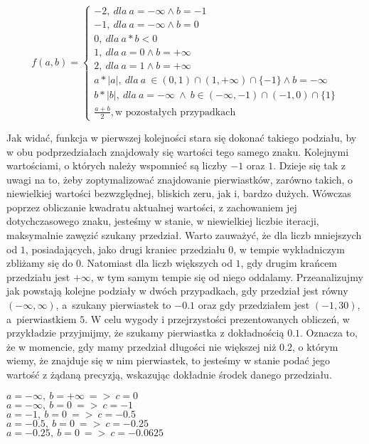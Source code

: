 \[
f(a,b)=\left\{
\begin{array}{ll}
-2,\ dla\ a=-\infty \wedge b=-1\\
-1,\ dla\ a=-\infty \wedge b=0\\
0,\ dla\ a*b<0\\
1,\ dla\ a=0 \wedge b=+\infty\\
2,\ dla\ a=1 \wedge b=+\infty\\
a*|a|,\ dla\ a~\in (0,1) \cap (1,+\infty) \cap \{-1\} \wedge b=-\infty\ \\
b*|b|,\ dla\ a=-\infty\ \wedge \ b \in (-\infty,-1) \cap (-1,0) \cap \{1\}\\
\frac{a+b}{2},\text{w pozostałych przypadkach}
\end{array}
\right.
\]

Jak widać, funkcja w pierwszej kolejności stara się dokonać takiego podziału, by w obu podprzedziałach znajdowały się wartości tego samego znaku. Kolejnymi wartościami, o których należy wspomnieć są liczby $-1$ oraz $1$. Dzieje się tak z uwagi na to, żeby zoptymalizować znajdowanie pierwiastków, zarówno takich, o niewielkiej wartości bezwzględnej, bliskich zeru, jak i, bardzo dużych. Wówczas poprzez obliczanie kwadratu aktualnej wartości, z zachowaniem jej dotychczasowego znaku, jesteśmy w stanie, w niewielkiej liczbie iteracji, maksymalnie zawęzić szukany przedział. Warto zauważyć, że dla liczb mniejszych od $1$, posiadających, jako drugi kraniec przedziału $0$, w tempie wykładniczym zbliżamy się do $0$. Natomiast dla liczb większych od $1$, gdy drugim krańcem przedziału jest $+\infty$, w tym samym tempie się od niego oddalamy. Przeanalizujmy jak powstają kolejne podziały w dwóch przypadkach, gdy przedział jest równy $(-\infty,\infty)$, a~szukany pierwiastek to $-0.1$ oraz gdy przedziałem jest $(-1,30)$, a~pierwiastkiem $5$. W celu wygody i przejrzystości prezentowanych obliczeń, w przykładzie przyjmijmy, że szukamy pierwiastka z dokładnością $0.1$. Oznacza to, że w momencie, gdy mamy przedział długości nie większej niż $0.2$, o którym wiemy, że znajduje się w nim pierwiastek, to jesteśmy w stanie podać jego wartość z żądaną precyzją, wskazując dokładnie środek danego przedziału.

\begin{example}
	$ $ \\
	$a = -\infty,\ b = +\infty\ =>\ c=0$ \\
	$a = -\infty,\ b = 0\ =>\ c=-1$ \\
	$a = -1,\ b = 0\ =>\ c=-0.5$ \\
	$a = -0.5,\ b = 0\ =>\ c=-0.25$ \\
	$a = -0.25,\ b = 0\ =>\ c=-0.0625$
\end{example}

